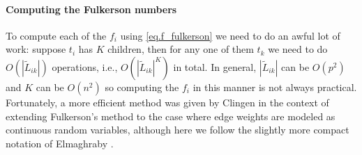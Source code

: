 \documentclass[12pt]{article}
\def\P{\mathbb{P}}
\begin{document}

\paragraph{Computing the Fulkerson numbers}
\label{para.fulkerson_computing}

To compute each of the $f_i$ using \eqref{eq.f_fulkerson} we need to do an awful lot of work: suppose $t_i$ has $K$ children, then for any one of them $t_k$ we need to do $O(|\tilde{L}_{ik}|)$ operations, i.e., $O(|\tilde{L}_{ik}|^K)$ in total. In general, $|\tilde{L}_{ik}|$ can be $O(p^2)$ and $K$ can be $O(n^2)$ so computing the $f_i$ in this manner is not always practical. Fortunately, a more efficient method was given by Clingen \cite{cling64} in the context of extending Fulkerson's method to the case where edge weights are modeled as continuous random variables, although here we follow the slightly more compact notation of Elmaghraby \cite{elmaghraby67}. 
\end{document}
